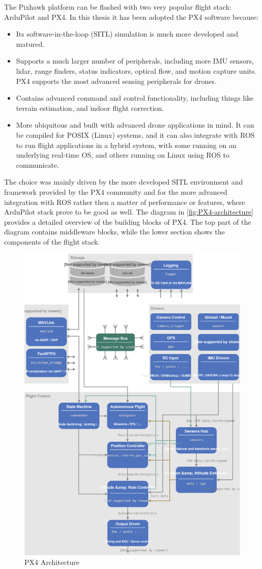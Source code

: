 The Pixhawk platform can be flashed with two very popular flight stack: ArduPilot and PX4.
In this thesis it has been adopted the PX4 software because:
\begin{itemize}
	\item Its software-in-the-loop (SITL) simulation is much more developed and matured.
 	\item Supports a much larger number of peripherals, including more IMU sensors, lidar, range finders, status indicators, optical flow, and motion capture units. PX4 supports the most advanced sensing peripherals for drones.
 	\item Contains advanced command and control functionality, including things like terrain estimation, and indoor flight correction.
 	\item More ubiquitous and built with advanced drone applications in mind. It can be compiled for POSIX (Linux) systems, and it can also integrate with ROS to run flight applications in a hybrid system, with some running on an underlying real-time OS, and others running on Linux using ROS to communicate.
 \end{itemize} 
 The choice was mainly driven by the more developed SITL environment and framework provided by the PX4 community and for the more advanced integration with ROS rather then a matter of performance or features, where ArduPilot stack prove to be good as well.
 The diagram in \autoref{fig:PX4-architecture} provides a detailed overview of the building blocks of PX4. The top part of the diagram contains middleware blocks, while the lower section shows the components of the flight stack.
 \begin{figure}[ht]
    \centering
    \includegraphics[width=.6\textwidth]{figures/A2/PX4_Architecture.pdf}
    \caption{PX4 Architecture}
    \label{fig:PX4-architecture}
\end{figure}

